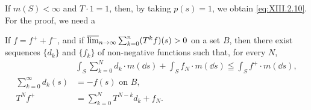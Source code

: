 If $m(S) < \infty$ and $T \cdot 1 = 1$, then, by taking $p(s) = 1$, we obtain \eqref{eq:XIII.2.10}. For the proof, we need a 

\begin{lemman} If $f = f^{+} + f^{-}$, and if $\varlimsup\limits_{n\to \infty}\sum\limits_{k=0}^{n}(T^{k}f)(s) > 0$ on a set $B$, then there exist sequences $\{d_k\}$ and $\{f_k\}$ of non-negative functions such that, for every $N$,
\begin{align}
&\int_{S} \sum\limits_{k=0} ^{N} d _{k} \cdot m (\dd s) + \int_{S} f _{N} \cdot m (\dd s) \leqq \int_{S} f ^{+} \cdot m (\dd s), \label{eq:XIII.2.15} \\
\sum\limits_{k=0} ^{\infty} d _{k} (s)& = - f (s) \text{ on } B, \label{eq:XIII.2.16} \\
T ^{N} f ^{+}& = \sum\limits_{k=0} ^{N} T ^{N-k} d _{k} + f _{N}. \label{eq:XIII.2.17}
\end{align}

\end{lemman}
